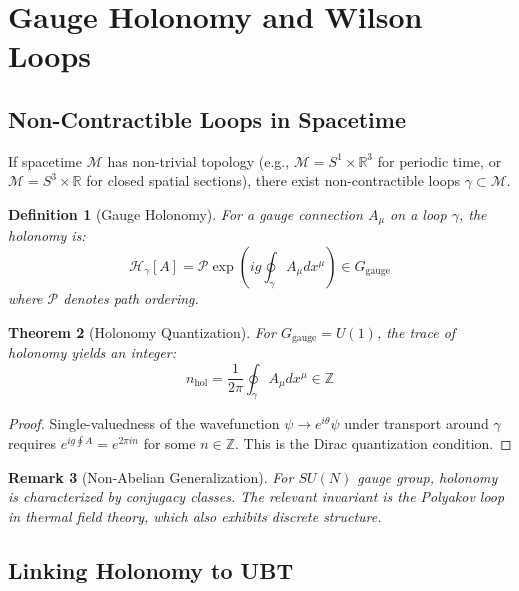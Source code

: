 \documentclass[12pt]{article}
\newtheorem{definition}{Definition}[section]
\newtheorem{theorem}[definition]{Theorem}
\newtheorem{remark}[definition]{Remark}
\newcommand{\R}{\mathbb{R}}
\newcommand{\Z}{\mathbb{Z}}
\newcommand{\M}{\mathcal{M}}
\begin{document}
\section{Gauge Holonomy and Wilson Loops}
\label{sec:holonomy}

\subsection{Non-Contractible Loops in Spacetime}

If spacetime $\M$ has non-trivial topology (e.g., $\M = S^1 \times \R^3$ for periodic time, or $\M = S^3 \times \R$ for closed spatial sections), there exist non-contractible loops $\gamma \subset \M$.

\begin{definition}[Gauge Holonomy]
For a gauge connection $A_\mu$ on a loop $\gamma$, the holonomy is:
\begin{equation}
\mathcal{H}_\gamma[A] = \mathcal{P} \exp\left( i g \oint_\gamma A_\mu dx^\mu \right) \in G_{\text{gauge}}
\end{equation}
where $\mathcal{P}$ denotes path ordering.
\end{definition}

\begin{theorem}[Holonomy Quantization]
For $G_{\text{gauge}} = U(1)$, the trace of holonomy yields an integer:
\begin{equation}
n_{\text{hol}} = \frac{1}{2\pi} \oint_\gamma A_\mu dx^\mu \in \Z
\end{equation}
\end{theorem}

\begin{proof}
Single-valuedness of the wavefunction $\psi \to e^{i\theta} \psi$ under transport around $\gamma$ requires $e^{i g \oint A} = e^{2\pi i n}$ for some $n \in \Z$. This is the Dirac quantization condition.
\end{proof}

\begin{remark}[Non-Abelian Generalization]
For $SU(N)$ gauge group, holonomy is characterized by conjugacy classes. The relevant invariant is the Polyakov loop in thermal field theory, which also exhibits discrete structure.
\end{remark}

\subsection{Linking Holonomy to UBT}
\end{document}
